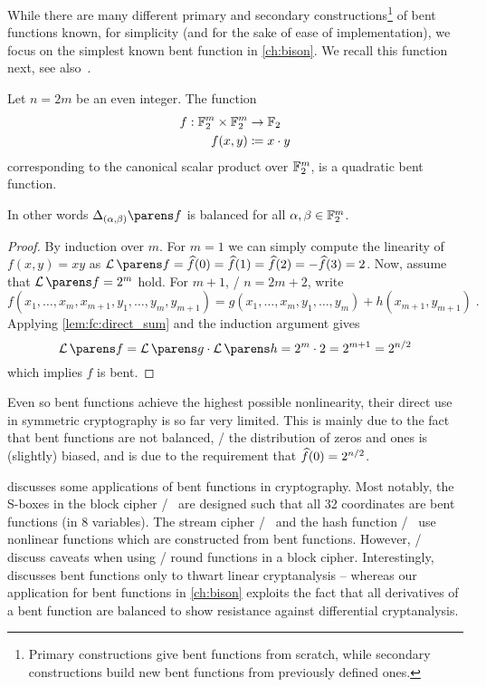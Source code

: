 While there are many different primary and secondary constructions\footnote{%
    Primary constructions give bent functions from scratch, while secondary constructions build new bent functions from previously defined ones.
} of bent functions known, for simplicity (and for the sake of ease of implementation), we focus on the simplest known bent function in \cref{ch:bison}.
We recall this function next, see also~\cite[Section~6.2]{BMM:Carlet10a}.
\begin{lemma}\label{lem:inner-product-bent}
    Let $n = 2 m$ be an even integer.
    The function
    \begin{align*}
        f : \mathbb{F}_2^m \times \mathbb{F}_2^m &\to \mathbb{F}_2 \\
        f(x,y) &\coloneqq x \cdot y
    \end{align*}
    corresponding to the canonical scalar product over $\mathbb{F}_2^m$, is a quadratic bent function.

    In other words $\derive{(\alpha, \beta)}{f}$ is balanced for all $\alpha, \beta \in \mathbb{F}_2^m$.
\end{lemma}
\begin{proof}
    By induction over $m$.
    For $m=1$ we can simply compute the linearity of $f(x,y) = xy$ as $\linearity{f} = \FC{f}(0) = \FC{f}(1) = \FC{f}(2) = -\FC{f}(3) = 2$.
    Now, assume that $\linearity{f} = 2^m$ hold.
    For $m+1$, \ie/ $n = 2m + 2$, write
    \begin{equation*}
        f(x_1, \ldots, x_m, x_{m+1}, y_1, \ldots, y_m, y_{m+1}) = g(x_1, \ldots, x_m, y_1, \ldots, y_m) + h(x_{m+1}, y_{m+1})\;.
    \end{equation*}
    Applying \cref{lem:fc:direct_sum} and the induction argument gives
    \begin{equation*}
        \linearity{f} = \linearity{g} \cdot \linearity{h} = 2^m \cdot 2 = 2^{m+1} = 2^{n/2}
    \end{equation*}
    which implies $f$ is bent.
\end{proof}

Even so bent functions achieve the highest possible nonlinearity, their direct use in symmetric cryptography is so far very limited.
This is mainly due to the fact that bent functions are not balanced, \ie/ the distribution of zeros and ones is (slightly) biased, and is due to the requirement that $\widehat{f}(0) = 2^{n/2}$.

\textcite[Chapter~4]{tokareva15} discusses some applications of bent functions in cryptography.
Most notably, the S-boxes in the block cipher \cast/~\cite{DCC:Adams97} are designed such that all 32 coordinates are bent functions (in 8 variables).
The stream cipher \grain/~\cite{ISIT:HJMM06} and the hash function \haval/~\cite{AC:ZhePieSeb92} use nonlinear functions which are constructed from bent functions.
However, \eg/ \textcite{EC:CanVid02} discuss caveats when using \AB/ round functions in a block cipher.
Interestingly, \citeauthor{tokareva15} discusses bent functions only to thwart linear cryptanalysis -- whereas our application for bent functions in \cref{ch:bison} exploits the fact that all derivatives of a bent function are balanced to show resistance against differential cryptanalysis.

